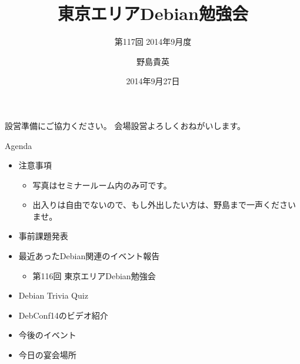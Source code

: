 \title{東京エリアDebian勉強会}
\subtitle{第117回 2014年9月度}
\author{野島貴英}
\date{2014年9月27日}



\begin{frame}
\titlepage{}
\end{frame}

\begin{frame}{設営準備にご協力ください。}
会場設営よろしくおねがいします。
\end{frame}

\begin{frame}{Agenda}
 \begin{minipage}[t]{0.45\hsize}
  \begin{itemize}
   \item 注意事項
	 \begin{itemize}
	  \item 写真はセミナールーム内のみ可です。
          \item 出入りは自由でないので、もし外出したい方は、野島まで一声くださいませ。
	 \end{itemize}
   \item 事前課題発表
  \end{itemize}
 \end{minipage} 
 \begin{minipage}[t]{0.45\hsize}
  \begin{itemize}
   \item 最近あったDebian関連のイベント報告
	 \begin{itemize}
	  \item 第116回 東京エリアDebian勉強会
	 \end{itemize}
   \item Debian Trivia Quiz
   \item DebConf14のビデオ紹介
   \item 今後のイベント
   \item 今日の宴会場所
  \end{itemize}
 \end{minipage}
\end{frame}

